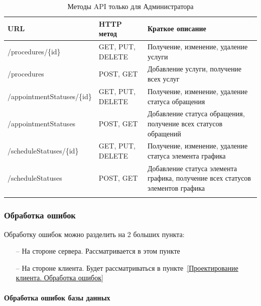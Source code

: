 \documentclass[a4paper,article]{article}
\begin{document}
\begin{sloppypar}
\begin{xltabular}{\textwidth} { |
        >{\hsize} X |
        >{\hsize} X |
        >{\hsize} X | }
        \hline
        URL
        & HTTP метод
        & Краткое описание \\

        \hline
        /procedures/\{id\}
        & GET, PUT, DELETE
        & Получение, изменение, удаление услуги \\

        \hline
        /procedures
        & POST, GET
        & Добавление услуги, получение всех услуг \\

        \hline
        /appointmentStatuses/\{id\}
        & GET, PUT, DELETE
        & Получение, изменение, удаление статуса обращения \\

        \hline
        /appointmentStatuses
        & POST, GET
        & Добавление статуса обращения, получение всех статусов обращений \\

        \hline
        /scheduleStatuses/\{id\}
        & GET, PUT, DELETE
        & Получение, изменение, удаление статуса элемента графика \\

        \hline
        /scheduleStatuses
        & POST, GET
        & Добавление статуса элемента графика, получение всех статусов элементов графика \\

        \hline

        \caption{\centering Методы API только для Администратора}

        \label{tab:Методы API только для Администатора}
    \end{xltabular}

    \subsubsection{Обработка ошибок}\label{Проектирование сервера. Обработка ошибок}

    Обработку ошибок можно разделить на 2 больших пункта:

    \begin{itemize}[nolistsep]
        \item[--] На стороне сервера. Рассматривается в этом пункте
        \item[--] На стороне клиента. Будет рассматриваться в пункте~\ref{Проектирование клиента. Обработка ошибок}
    \end{itemize}

    \paragraph{Обработка ошибок базы данных}


\end{sloppypar}
\end{document}
